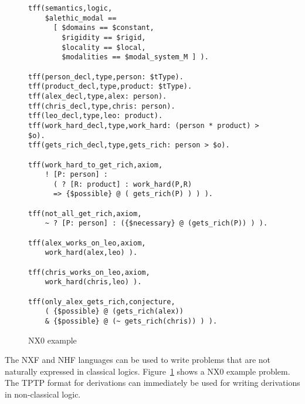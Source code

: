 \documentclass[runningheads]{llncs}
\begin{document}

\begin{figure}[htbp]
\small
{}
\begin{verbatim}
tff(semantics,logic,
    $alethic_modal ==
      [ $domains == $constant,
        $rigidity == $rigid,
        $locality == $local,
        $modalities == $modal_system_M ] ).

tff(person_decl,type,person: $tType).
tff(product_decl,type,product: $tType).
tff(alex_decl,type,alex: person).
tff(chris_decl,type,chris: person).
tff(leo_decl,type,leo: product).
tff(work_hard_decl,type,work_hard: (person * product) > $o).
tff(gets_rich_decl,type,gets_rich: person > $o).

tff(work_hard_to_get_rich,axiom,
    ! [P: person] :
      ( ? [R: product] : work_hard(P,R)
      => {$possible} @ ( gets_rich(P) ) ) ).

tff(not_all_get_rich,axiom,
    ~ ? [P: person] : ({$necessary} @ (gets_rich(P)) ) ).

tff(alex_works_on_leo,axiom,
    work_hard(alex,leo) ).

tff(chris_works_on_leo,axiom,
    work_hard(chris,leo) ).

tff(only_alex_gets_rich,conjecture,
    ( {$possible} @ (gets_rich(alex)) 
    & {$possible} @ (~ gets_rich(chris)) ) ).
\end{verbatim}
\caption{NX0 example}
\label{NX0Example}
\end{figure}


The NXF and NHF languages can be used to write problems that are not naturally expressed in
classical logics.
Figure~\ref{NX0Example} shows a NX0 example problem.
The TPTP format for derivations \cite{SS+06} can immediately be used for writing derivations in
non-classical logic.
\end{document}
